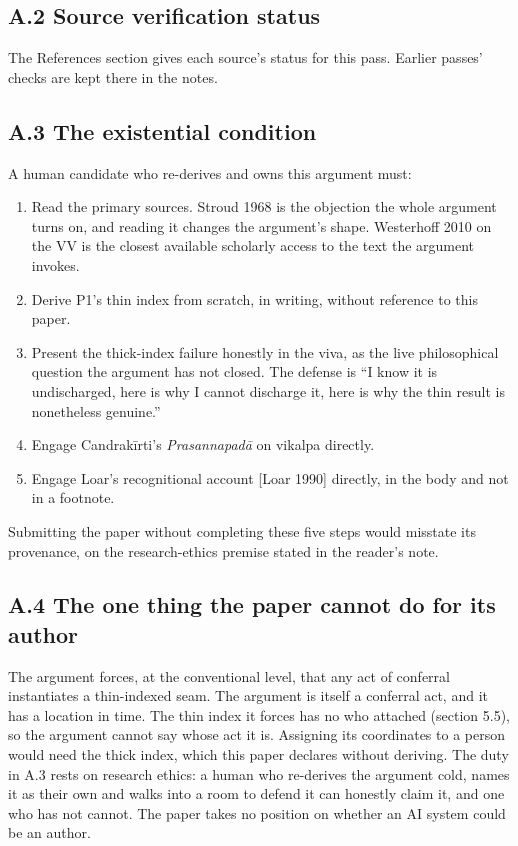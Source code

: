 \documentclass[11pt]{article}
\begin{document}
\subsection*{A.2 Source verification status}

The References section gives each source's status for this pass. Earlier passes' checks are kept there in the notes.

\subsection*{A.3 The existential condition}

A human candidate who re-derives and owns this argument must:

\begin{enumerate}
\item Read the primary sources. Stroud 1968 is the objection the whole argument turns on, and reading it changes the argument's shape. Westerhoff 2010 on the VV is the closest available scholarly access to the text the argument invokes.
\item Derive P1's thin index from scratch, in writing, without reference to this paper.
\item Present the thick-index failure honestly in the viva, as the live philosophical question the argument has not closed. The defense is ``I know it is undischarged, here is why I cannot discharge it, here is why the thin result is nonetheless genuine.''
\item Engage Candrakīrti's \emph{Prasannapadā} on vikalpa directly.
\item Engage Loar's recognitional account [Loar 1990] directly, in the body and not in a footnote.
\end{enumerate}
Submitting the paper without completing these five steps would misstate its provenance, on the research-ethics premise stated in the reader's note.

\subsection*{A.4 The one thing the paper cannot do for its author}

The argument forces, at the conventional level, that any act of conferral instantiates a thin-indexed seam. The argument is itself a conferral act, and it has a location in time. The thin index it forces has no who attached (section 5.5), so the argument cannot say whose act it is. Assigning its coordinates to a person would need the thick index, which this paper declares without deriving. The duty in A.3 rests on research ethics: a human who re-derives the argument cold, names it as their own and walks into a room to defend it can honestly claim it, and one who has not cannot. The paper takes no position on whether an AI system could be an author.
\end{document}

